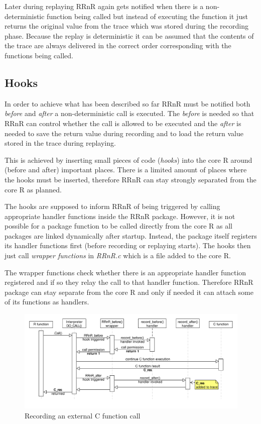 \documentclass[thesis=M,english,hidelinks]{FITthesis}[2012/10/20]
\begin{document}
		Later during replaying RRnR again gets notified when there is a non-deterministic function being called but instead of executing the function it just returns the original value from the trace which was stored during the recording phase. Because the replay is deterministic it can be assumed that the contents of the trace are always delivered in the correct order corresponding with the functions being called.\par

		\subsection{Hooks}
		In order to achieve what has been described so far RRnR must be notified both \emph{before} and \emph{after} a non-deterministic call is executed. The \emph{before} is needed so that RRnR can control whether the call is allowed to be executed and the \emph{after} is needed to save the return value during recording and to load the return value stored in the trace during replaying.\par
		
		This is achieved by inserting small pieces of code (\emph{hooks}) into the core R around (before and after) important places. There is a limited amount of places where the hooks must be inserted, therefore RRnR can stay strongly separated from the core R as planned.\par
		
		The hooks are supposed to inform RRnR of being triggered by calling appropriate handler functions inside the RRnR package. However, it is not possible for a package function to be called directly from the core R as all packages are linked dynamically after startup. Instead, the package itself registers its handler functions first (before recording or replaying starts). The hooks then just call \emph{wrapper functions} in \emph{RRnR.c} which is a file added to the core R.\par
		
		The wrapper functions check whether there is an appropriate handler function registered and if so they relay the call to that handler function. Therefore RRnR package can stay separate from the core R and only if needed it can attach some of its functions as handlers.\par
		
		\begin{figure}[ht]\centering
			\includegraphics[width=1.0\textwidth]{img/call_capturing}
			\caption{Recording an external C function call}\label{fig:call_capturing}
		\end{figure}
		
\end{document}
